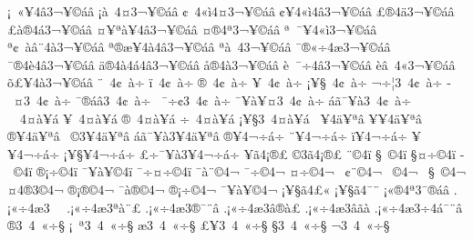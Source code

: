 {^^a1^^a0^^ab^^a54^^e23^^ac^^a5^^a9^^e1^^e2
^^a1^^e0^^a0^^ad4^^a43^^ac^^a5^^a9^^e1^^e2
^^a2^^a04^^ab^^ec4^^a43^^ac^^a5^^a9^^e1^^e2
^^a2^^a54^^ab^^ec4^^e23^^ac^^a5^^a9^^e1^^e2
^^a3^^ae4^^e43^^ac^^a5^^a9^^e1^^e2
^^a3^^e0^^ae4^^e13^^ac^^a5^^a9^^e1^^e2
^^a4^^a5^^aa^^e0^^a54^^e23^^ac^^a5^^a9^^e1^^e2
^^a4^^ae4^^aa3^^ac^^a5^^a9^^e1^^e2
^^aa^^a0^^af^^a54^^ab^^ec3^^ac^^a5^^a9^^e1^^e2
^^aa^^a2^^a0^^e0^^e2^^a84^^e03^^ac^^a5^^a9^^e1^^e2
^^aa^^ae^^ad^^e6^^a54^^e04^^e23^^ac^^a5^^a9^^e1^^e2
^^aa^^e0^^a04^^ad3^^ac^^a5^^a9^^e1^^e2
^^af^^ae^^ab^^f74^^e63^^ac^^a5^^a9^^e1^^e2
^^af^^ae4^^e84^^e23^^ac^^a5^^a9^^e1^^e2
^^e4^^ae4^^e04^^e14^^e23^^ac^^a5^^a9^^e1^^e2
^^e5^^ae4^^e03^^ac^^a5^^a9^^e1^^e2
^^e8^^a0^^af^^f74^^e23^^ac^^a5^^a9^^e1^^e2
^^e8^^e2^^a04^^ab3^^ac^^a5^^a9^^e1^^e2
^^f5^^a3^^a54^^e03^^ac^^a5^^a9^^e1^^e2
^^a8^^a04^^a2^^a0^^e0^^f7
^^ef^^a04^^a2^^a0^^e0^^f7
^^ae^^a04^^a2^^a0^^e0^^f7
^^a5^^a04^^a2^^a0^^e0^^f7
^^a1^^a5^^a7^^a04^^a2^^a0^^e0^^f7
^^ac^^f7^^a63^^a04^^a2^^a0^^e0^^f7
^^ad^^a0^^a43^^a04^^a2^^a0^^e0^^f7
^^af^^ae^^e1^^e23^^a04^^a2^^a0^^e0^^f7
^^ad^^a0^^af^^f7^^a23^^a04^^a2^^a0^^e0^^f7
^^af^^a5^^e0^^a5^^a43^^a04^^a2^^a0^^e0^^f7
^^e1^^e3^^af^^a5^^e03^^a04^^a2^^a0^^e0^^f7
^^a0^^a04^^a4^^e0^^a5^^e1
^^a5^^a04^^a4^^e0^^a5^^e1
^^ae^^a04^^a4^^e0^^a5^^e1
^^f7^^a04^^a4^^e0^^a5^^e1
^^a1^^a5^^a73^^a04^^a4^^e0^^a5^^e1
^^a0^^a54^^e4^^a5^^aa^^e2
^^a5^^a54^^e4^^a5^^aa^^e2
^^ae^^a54^^e4^^a5^^aa^^e2
^^ad^^a0^^a93^^a54^^e4^^a5^^aa^^e2
^^e1^^e3^^af^^a5^^e03^^a54^^e4^^a5^^aa^^e2
^^ae^^a54^^ac^^f7^^e1^^f7
^^a8^^a54^^ac^^f7^^e1^^f7
^^ef^^a54^^ac^^f7^^e1^^f7
^^a5^^a54^^ac^^f7^^e1^^f7
^^a1^^a5^^a7^^a54^^ac^^f7^^e1^^f7
^^a3^^f7^^af^^a5^^e03^^a54^^ac^^f7^^e1^^f7
^^a5^^e34^^a1^^ae^^a3
^^a93^^e34^^a1^^ae^^a3
^^a8^^a94^^ad^^ef
^^a7^^a0^^a94^^ad^^ef
^^a7^^a4^^f7^^a94^^ad^^ef
^^ad^^a0^^a94^^ad^^ef
^^ae^^a1^^f7^^a94^^ad^^ef
^^af^^a5^^e0^^a5^^a94^^ad^^ef
^^af^^f7^^a4^^f7^^a94^^ad^^ef
^^af^^e0^^a8^^a94^^ac
^^af^^f7^^a94^^ac
^^a4^^f7^^a94^^ac^^a0
^^a2^^a8^^a94^^ac
^^ad^^a0^^a94^^ac^^a0
^^a7^^a0^^a94^^ac
^^a44^^ae3^^a94^^ac
^^ae^^a1^^ae^^a94^^ac
^^af^^e0^^ae^^a94^^ac
^^ae^^a1^^f7^^a94^^ac
^^af^^a5^^e0^^a5^^a94^^ac
^^a1^^a5^^a7^^e34^^a3^^ab
^^a1^^a5^^a7^^e34^^af^^a8^^ad
^^a1^^ab^^ae4^^aa3^^af^^ae^^e1^^e2
.^^a1^^ab^^f74^^e63^^a0^^ad^^a0
.^^a1^^ab^^f74^^e63^^aa^^e0^^a8^^a3
.^^a1^^ab^^f74^^e63^^ae^^af^^a8^^e2
.^^a1^^ab^^f74^^e63^^e2^^ae^^e0^^a3
.^^a1^^ab^^f74^^e63^^e2^^e3^^e0
.^^a1^^ab^^f74^^e63^^f74^^e1^^af^^a8^^e2
^^ae3^^a04^^ad^^a0^^ab^^f7^^a7
^^a1^^a0^^aa3^^a04^^ad^^a0^^ab^^f7^^a7
^^e63^^a04^^ad^^a0^^ab^^f7^^a7
^^a3^^a5^^ad3^^a04^^ad^^a0^^ab^^f7^^a7
^^a73^^a04^^ad^^a0^^ab^^f7^^a7
^^ac3^^a04^^ad^^a0^^ab^^f7^^a7
}
